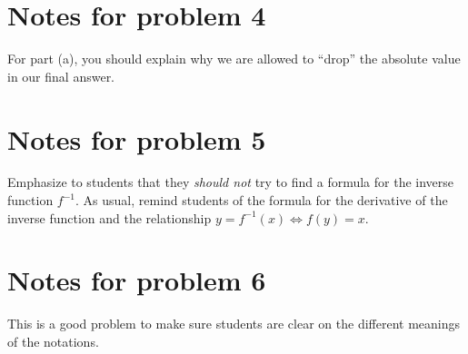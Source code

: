 \documentclass[nooutcomes]{ximera}
\begin{document}
\section{Notes for problem 4}
For part (a), you should explain why we are allowed to ``drop'' the absolute value in our final answer.

\section{Notes for problem 5}
Emphasize to students that they \emph{should not} try to find a formula for the inverse function $f^{-1}$.
As usual, remind students of the formula for the derivative of the inverse function and the relationship $y = f^{-1}(x) \iff f(y) = x$.

\section{Notes for problem 6}
This is a good problem to make sure students are clear on the different meanings of the notations.
\end{document}
